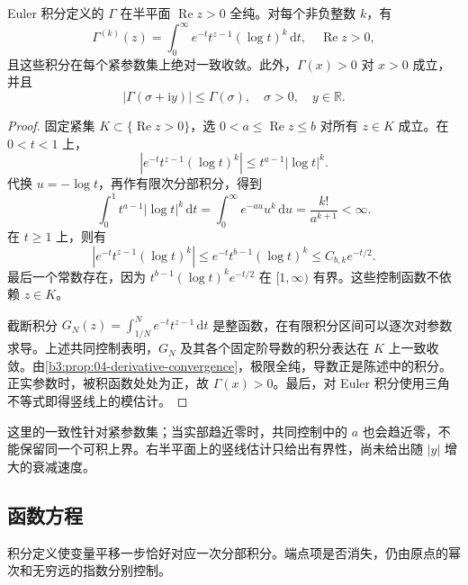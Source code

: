 \begin{proposition}[全纯性与参数导数]\label{b3:prop:21-euler-derivatives}
Euler 积分定义的 \(\Gamma\) 在半平面 \(\operatorname{Re}z>0\) 全纯。对每个非负整数 \(k\)，有
\[
 \Gamma^{(k)}(z)
 =\int_0^\infty e^{-t}t^{z-1}(\log t)^k\,\mathrm{d}t,
 \quad \operatorname{Re}z>0,
\]
且这些积分在每个紧参数集上绝对一致收敛。此外，\(\Gamma(x)>0\) 对 \(x>0\) 成立，并且
\[
 |\Gamma(\sigma+\mathrm{i}y)|\le\Gamma(\sigma),
 \quad \sigma>0,\quad y\in\mathbb R.
\]
\end{proposition}
\begin{proof}
固定紧集 \(K\subset\{\operatorname{Re}z>0\}\)，选 \(0<a\le\operatorname{Re}z\le b\) 对所有 \(z\in K\) 成立。在 \(0<t<1\) 上，
\[
 |e^{-t}t^{z-1}(\log t)^k|
 \le t^{a-1}|\log t|^k.
\]
代换 \(u=-\log t\)，再作有限次分部积分，得到
\[
 \int_0^1t^{a-1}|\log t|^k\,\mathrm{d}t
 =\int_0^\infty e^{-au}u^k\,\mathrm{d}u
 =\frac{k!}{a^{k+1}}<\infty.
\]
在 \(t\ge1\) 上，则有
\[
 |e^{-t}t^{z-1}(\log t)^k|
 \le e^{-t}t^{b-1}(\log t)^k
 \le C_{b,k}e^{-t/2}.
\]
最后一个常数存在，因为 \(t^{b-1}(\log t)^k e^{-t/2}\) 在 \([1,\infty)\) 有界。这些控制函数不依赖 \(z\in K\)。

截断积分 \(G_N(z)=\int_{1/N}^{N}e^{-t}t^{z-1}\,\mathrm{d}t\) 是整函数，在有限积分区间可以逐次对参数求导。上述共同控制表明，\(G_N\) 及其各个固定阶导数的积分表达在 \(K\) 上一致收敛。由\cref{b3:prop:04-derivative-convergence}，极限全纯，导数正是陈述中的积分。正实参数时，被积函数处处为正，故 \(\Gamma(x)>0\)。最后，对 Euler 积分使用三角不等式即得竖线上的模估计。
\end{proof}
这里的一致性针对紧参数集；当实部趋近零时，共同控制中的 \(a\) 也会趋近零，不能保留同一个可积上界。右半平面上的竖线估计只给出有界性，尚未给出随 \(|y|\) 增大的衰减速度。

\subsection{函数方程}
\label{b3:subsec:210102}

积分定义使变量平移一步恰好对应一次分部积分。端点项是否消失，仍由原点的幂次和无穷远的指数分别控制。

